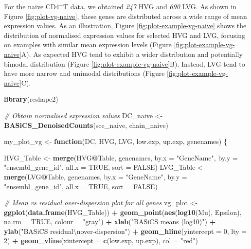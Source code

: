 \documentclass[9pt,a4paper,]{extarticle}
\newenvironment{Shaded}{\begin{snugshade}}{\end{snugshade}}
\newcommand{\CharTok}[1]{\textcolor[rgb]{0.31,0.60,0.02}{#1}}
\newcommand{\CommentTok}[1]{\textcolor[rgb]{0.56,0.35,0.01}{\textit{#1}}}
\newcommand{\ControlFlowTok}[1]{\textcolor[rgb]{0.13,0.29,0.53}{\textbf{#1}}}
\newcommand{\DataTypeTok}[1]{\textcolor[rgb]{0.13,0.29,0.53}{#1}}
\newcommand{\DecValTok}[1]{\textcolor[rgb]{0.00,0.00,0.81}{#1}}
\newcommand{\KeywordTok}[1]{\textcolor[rgb]{0.13,0.29,0.53}{\textbf{#1}}}
\newcommand{\NormalTok}[1]{#1}
\newcommand{\OperatorTok}[1]{\textcolor[rgb]{0.81,0.36,0.00}{\textbf{#1}}}
\newcommand{\OtherTok}[1]{\textcolor[rgb]{0.56,0.35,0.01}{#1}}
\newcommand{\StringTok}[1]{\textcolor[rgb]{0.31,0.60,0.02}{#1}}
\begin{document}
For the naive CD4\(^+\)T data, we obtained \emph{247}
HVG and \emph{690} LVG.
As shown in Figure \ref{fig:plot-vg-naive}, these genes are distributed across
a wide range of mean expression values.
As an illustration, Figure \ref{fig:plot-example-vg-naive} shows the
distribution of normalised expression values for selected HVG and LVG, focusing
on examples with similar mean expression levels (Figure
\ref{fig:plot-example-vg-naive}A).
As expected HVG tend to exhibit a wider distribution and potentially bimodal
distribution (Figure \ref{fig:plot-example-vg-naive}B).
Instead, LVG tend to have more narrow and unimodal distributions
(Figure \ref{fig:plot-example-vg-naive}C).

\begin{Shaded}
\begin{Highlighting}[]
\KeywordTok{library}\NormalTok{(reshape2)}

\CommentTok{# Obtain normalised expression values}
\NormalTok{DC_naive <-}\StringTok{ }\KeywordTok{BASiCS_DenoisedCounts}\NormalTok{(sce_naive, chain_naive)}

\NormalTok{my_plot_vg <-}\StringTok{ }\ControlFlowTok{function}\NormalTok{(DC, HVG, LVG, low.exp, up.exp, genenames) \{}
  
\NormalTok{  HVG_Table <-}\StringTok{ }\KeywordTok{merge}\NormalTok{(HVG}\OperatorTok{@}\NormalTok{Table, genenames, }
                     \DataTypeTok{by.x =} \StringTok{"GeneName"}\NormalTok{, }\DataTypeTok{by.y =} \StringTok{"ensembl_gene_id"}\NormalTok{, }
                     \DataTypeTok{all.x =} \OtherTok{TRUE}\NormalTok{, }\DataTypeTok{sort =} \OtherTok{FALSE}\NormalTok{)}
\NormalTok{  LVG_Table <-}\StringTok{ }\KeywordTok{merge}\NormalTok{(LVG}\OperatorTok{@}\NormalTok{Table, genenames, }
                     \DataTypeTok{by.x =} \StringTok{"GeneName"}\NormalTok{, }\DataTypeTok{by.y =} \StringTok{"ensembl_gene_id"}\NormalTok{, }
                     \DataTypeTok{all.x =} \OtherTok{TRUE}\NormalTok{, }\DataTypeTok{sort =} \OtherTok{FALSE}\NormalTok{)}
  
  \CommentTok{# Mean vs residual over-dispersion plot for all genes}
\NormalTok{  vg_plot <-}\StringTok{ }\KeywordTok{ggplot}\NormalTok{(}\KeywordTok{data.frame}\NormalTok{(HVG_Table)) }\OperatorTok{+}
\StringTok{    }\KeywordTok{geom_point}\NormalTok{(}\KeywordTok{aes}\NormalTok{(}\KeywordTok{log10}\NormalTok{(Mu), Epsilon), }\DataTypeTok{na.rm =} \OtherTok{TRUE}\NormalTok{, }\DataTypeTok{colour =} \StringTok{"gray"}\NormalTok{) }\OperatorTok{+}
\StringTok{    }\KeywordTok{xlab}\NormalTok{(}\StringTok{"BASiCS means (log10)"}\NormalTok{) }\OperatorTok{+}
\StringTok{    }\KeywordTok{ylab}\NormalTok{(}\StringTok{"BASiCS residual}\CharTok{\textbackslash{}n}\StringTok{over-dispersion"}\NormalTok{) }\OperatorTok{+}
\StringTok{    }\KeywordTok{geom_hline}\NormalTok{(}\DataTypeTok{yintercept =} \DecValTok{0}\NormalTok{, }\DataTypeTok{lty =} \DecValTok{2}\NormalTok{) }\OperatorTok{+}
\StringTok{    }\KeywordTok{geom_vline}\NormalTok{(}\DataTypeTok{xintercept =} \KeywordTok{c}\NormalTok{(low.exp, up.exp), }\DataTypeTok{col =} \StringTok{"red"}\NormalTok{)}
    

\end{Highlighting}
\end{Shaded}
\end{document}

